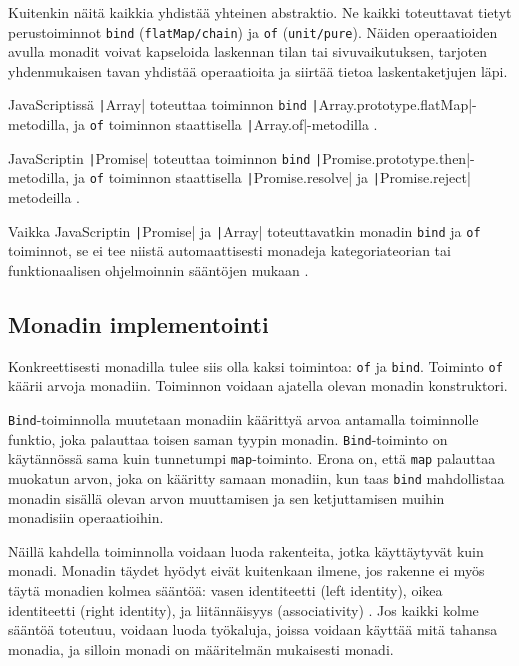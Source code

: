 Kuitenkin näitä kaikkia yhdistää yhteinen abstraktio. Ne kaikki toteuttavat tietyt perustoiminnot \texttt{bind} (\texttt{flatMap/chain}) ja \texttt{of} (\texttt{unit/pure}). Näiden operaatioiden avulla monadit voivat kapseloida laskennan tilan tai sivuvaikutuksen, tarjoten yhdenmukaisen tavan yhdistää operaatioita ja siirtää tietoa laskentaketjujen läpi.

JavaScriptissä \texttt|Array| toteuttaa toiminnon \texttt{bind} \texttt|Array.prototype.flatMap|-metodilla, ja \texttt{of} toiminnon staattisella \texttt|Array.of|-metodilla \cite{stackoverflow_flatmap_monad,stackoverflow_js_array_monad}.


JavaScriptin \texttt|Promise| toteuttaa toiminnon \texttt{bind} \texttt|Promise.prototype.then|-metodilla, ja \texttt{of} toiminnon staattisella \texttt|Promise.resolve| ja \texttt|Promise.reject| metodeilla \cite{read-it-later-11481,stackoverflow:why_monad,promises-spec-94}.

Vaikka JavaScriptin \texttt|Promise| ja \texttt|Array| toteuttavatkin monadin \texttt{bind} ja \texttt{of} toiminnot, se ei tee niistä automaattisesti monadeja kategoriateorian tai funktionaalisen ohjelmoinnin sääntöjen mukaan \cite{promises-spec-94,stackoverflow:why_monad,stackoverflow_js_array_monad}.


\subsection{Monadin implementointi}

Konkreettisesti monadilla tulee siis olla kaksi toimintoa: \texttt{of} ja \texttt{bind}. Toiminto \texttt{of} käärii arvoja monadiin. Toiminnon voidaan ajatella olevan monadin konstruktori. \citep{stackoverflow_what_monad}

\texttt{Bind}-toiminnolla muutetaan monadiin käärittyä arvoa antamalla toiminnolle funktio, joka palauttaa toisen saman tyypin monadin. \cite{stackoverflow_what_monad} \texttt{Bind}-toiminto on käytännössä sama kuin tunnetumpi \texttt{map}-toiminto. Erona on, että \texttt{map} palauttaa muokatun arvon, joka on kääritty samaan monadiin, kun taas \texttt{bind} mahdollistaa monadin sisällä olevan arvon muuttamisen ja sen ketjuttamisen muihin monadisiin operaatioihin.

Näillä kahdella toiminnolla voidaan luoda rakenteita, jotka käyttäytyvät kuin monadi. Monadin täydet hyödyt eivät kuitenkaan ilmene, jos rakenne ei myös täytä monadien kolmea sääntöä: vasen identiteetti (left identity), oikea identiteetti (right identity), ja liitännäisyys (associativity) \cite{haskellmonadlaws}. Jos kaikki kolme sääntöä toteutuu, voidaan luoda työkaluja, joissa voidaan käyttää mitä tahansa monadia, ja silloin monadi on määritelmän mukaisesti monadi.

